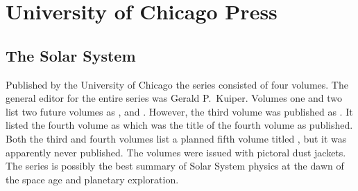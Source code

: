 
\section{University of Chicago Press}
\subsection{The Solar System}

Published by the University of Chicago the series consisted of four
volumes.  The general editor for the entire series was Gerald
P.\ Kuiper. Volumes one and two list two future volumes as , and .  However,
the third volume was published as . It
listed the fourth volume as 
which was the title of the fourth volume as published. Both the third
and fourth volumes list a planned fifth volume titled , but it was apparently never published. The
volumes were issued with pictoral dust jackets.  The series is
possibly the best summary of Solar System physics at the dawn of the
space age and planetary exploration.

